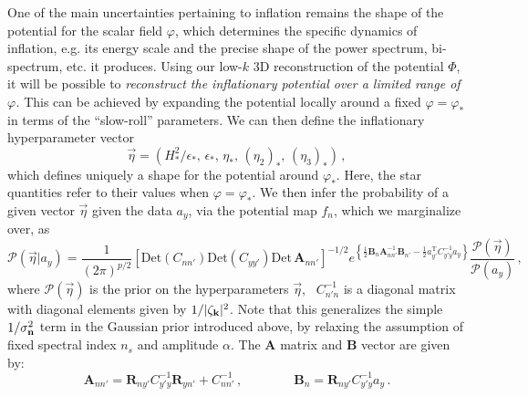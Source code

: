 \documentclass[psfig,12pt]{article}
\def\be{\begin{equation}}
\def\ee{\end{equation}}
\begin{document}
{One of the main uncertainties pertaining to inflation remains the shape
of the potential for the scalar field $\varphi$, which determines the
specific dynamics of inflation, e.g. its energy scale and the precise
shape of the power spectrum, bi-spectrum, etc. it produces. Using our
low-$k$ 3D reconstruction of the potential $\Phi$, it will  be
possible to {\it reconstruct the inflationary potential over a limited range
of $\varphi$.} This can be achieved by expanding the potential locally around
a fixed $\varphi=\varphi_*$ in
terms of the
``slow-roll'' parameters. We can then define the inflationary
hyperparameter vector
\be
	\vec{\eta}=(H^2_*/\epsilon_*,\, \epsilon_*, \,\eta_*, \, (\eta_2)_*, \,(\eta_3)_*)\, ,
\ee
which defines uniquely a shape for the potential around $\varphi_*$.
Here, the star quantities refer to their values when
$\varphi=\varphi_*$.
We then infer the probability
of a given vector $\vec{\eta}$ given the data $a_y$, via the potential
map $f_n$, which we marginalize over,
as
\be
\mathcal{P}(\vec{\eta}| a_{y})=\frac{1}{(2\pi)^{p/2}} \left[\mathrm{Det}(C_{nn'})\mathrm{Det}(C_{yy'})\mathrm{Det}\,\mathbf{A}_{nn'}\right]^{-1/2}e^{\left\{\frac{1}{2}\mathbf{B}_{n}\mathbf{A}_{nn'}^{-1}\mathbf{B}_{n'}-\frac{1}{2}a^{\mathrm{T}}_{y'}C_{y'y}^{-1}a_{y} \right\}}\frac{\mathcal{P}(\vec{\eta})}{\mathcal{P}(a_{y})}\, ,
\ee
where $\mathcal{P}(\vec{\eta})$ is the prior on the
hyperparameters $\vec{\eta}$,
~$C_{n'n}^{-1}$ is a diagonal matrix with diagonal elements given by
$1/|\zeta_{{\bf k}}|^2$.
Note that this generalizes the simple $1/{\sigma_{\bf n}^2}$ term
in the
Gaussian prior introduced above, by relaxing
the assumption of fixed spectral
index $n_s$ and amplitude $\alpha$.
The $\mathbf{A}$ matrix and $\mathbf{B}$ vector are given by:
\be
	\mathbf{A}_{nn'} = \mathbf{R}_{ny'}C^{-1}_{y'y} \mathbf{R}_{yn'}+C_{nn'}^{-1}\, ,\qquad \qquad
	 \mathbf{B}_{n}  = \mathbf{R}_{ny'} C_{y'y}^{-1}  a_{y}\, .
\ee

}
\end{document}

